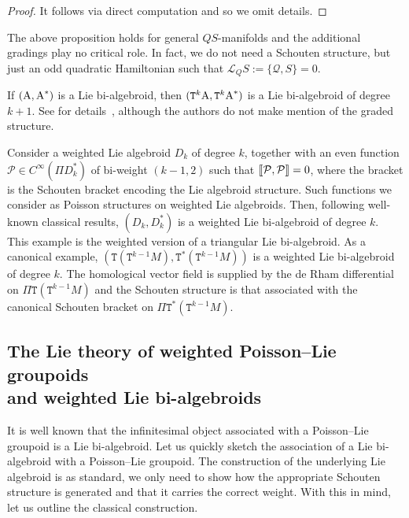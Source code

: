 \documentclass[pdftex]{sigma}
\newcommand{\Dleft}{[\hspace{-1.5pt}[}
\newcommand{\Dright}{]\hspace{-1.5pt}]}
\newcommand{\SN}[1]{\Dleft #1 \Dright}
\def\sT{{\mathtt T}}
\numberwithin{equation}{section}
\begin{document}
\begin{proof}
It follows via direct computation and so we omit details.
\end{proof}

\begin{Remark} The above proposition holds for general $QS$-manifolds and the additional gradings play no critical role. In fact, we do not need a Schouten structure, but just an odd quadratic Hamiltonian such that $\mathcal{L}_{Q}S:= \{\mathcal{Q}, S \} =0$.
\end{Remark}


\begin{Example}
If $(\textnormal{A}, \textnormal{A}^{*})$ is a Lie bi-algebroid, then $(\sT^{k}\textnormal{A}, \sT^{k}\textnormal{A}^{*})$ is a Lie bi-algebroid of degree $k+1$. See for details~\cite{KouotchopWamba:2013}, although  the authors do not make mention of the graded structure.
\end{Example}

\begin{Example}
Consider a weighted Lie algebroid $D_{k}$ of degree $k$, together with an even function $\mathcal{P} \in C^{\infty}(\Pi D_{k}^{*})$ of bi-weight $(k-1, 2)$ such that $\SN{\mathcal{P}, \mathcal{P}} =0$, where the bracket is the Schouten bracket encoding the Lie algebroid structure. Such functions we consider as Poisson structures on weighted Lie algebroids. Then, following well-known classical results, $(D_{k}, D_{k}^{*})$ is a weighted Lie bi-algebroid of degree $k$. This example is the weighted version of a triangular Lie bi-algebroid. As a canonical example, $(\sT(\sT^{k-1}M), \sT^{*}(\sT^{k-1}M))$ is a weighted Lie bi-algebroid of degree $k$.  The homological vector f\/ield is supplied by the de Rham dif\/ferential on $\Pi \sT(\sT^{k-1}M)$ and the Schouten structure is that associated with the canonical Schouten bracket on $\Pi \sT^{*}(\sT^{k-1}M)$.
\end{Example}

\subsection[The Lie theory of weighted Poisson--Lie groupoids and weighted Lie bi-algebroids]{The Lie theory of weighted Poisson--Lie groupoids\\ and weighted Lie bi-algebroids}

It is well known that the inf\/initesimal object associated with a Poisson--Lie groupoid is a Lie bi-algebroid. Let us quickly sketch the association of a Lie bi-algebroid with a Poisson--Lie groupoid. The construction of the underlying Lie algebroid is as standard, we only need to show how the appropriate Schouten  structure is generated and that it carries the correct weight. With this in mind, let us outline the classical construction.
\end{document}
